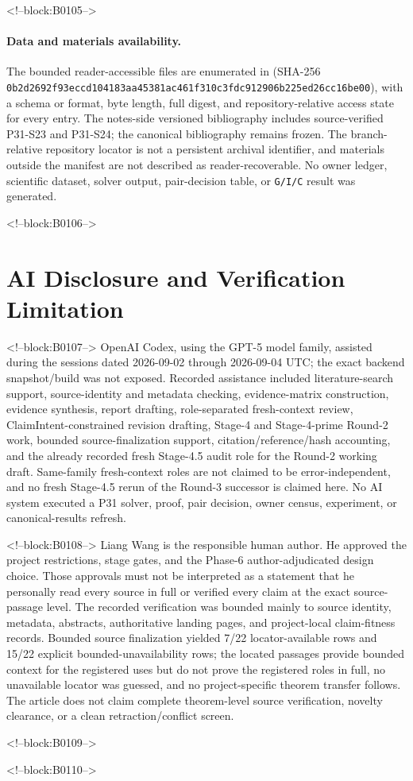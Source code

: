 \documentclass[11pt]{article}
\begin{document}
<!--block:B0105-->
\paragraph{Data and materials availability.}\begingroup\sloppy
The bounded reader-accessible files
are enumerated in
 (SHA-256
\texttt{0b2d2692f93eccd1\allowbreak{}04183aa45381ac46\allowbreak{}1f310c3fdc912906\allowbreak{}b225ed26cc16be00}), with a schema or format, byte length, full digest, and
repository-relative access state for every entry.  The notes-side versioned
bibliography includes source-verified P31-S23 and P31-S24; the canonical
bibliography remains frozen.  The branch-relative repository locator is not a
persistent archival identifier, and materials outside the manifest are not
described as reader-recoverable.  No owner ledger, scientific dataset, solver
output, pair-decision table, or \texttt{G/I/C} result was generated.
\par\endgroup

<!--block:B0106-->
\hypertarget{ai-disclosure-and-verification-limitation}{%
\section*{AI Disclosure and Verification
Limitation}\label{ai-disclosure-and-verification-limitation}}

<!--block:B0107-->
OpenAI Codex, using the GPT-5 model family, assisted during the
sessions dated 2026-09-02 through 2026-09-04 UTC; the exact backend
snapshot/build was not exposed. Recorded assistance included literature-search
support, source-identity and metadata checking, evidence-matrix construction,
evidence synthesis, report drafting, role-separated fresh-context review,
ClaimIntent-constrained revision drafting, Stage-4 and Stage-4-prime Round-2
work, bounded source-finalization support, citation/reference/hash accounting,
and the already recorded fresh Stage-4.5 audit role for the Round-2 working
draft. Same-family fresh-context roles are not claimed to be error-independent,
and no fresh Stage-4.5 rerun of the Round-3 successor is claimed here. No AI
system executed a P31 solver, proof, pair decision, owner census, experiment, or
canonical-results refresh.

<!--block:B0108-->
Liang Wang is the responsible human author. He approved the project
restrictions, stage gates, and the Phase-6 author-adjudicated design
choice. Those approvals must not be interpreted as a statement that he
personally read every source in full or verified every claim at the exact
source-passage level. The recorded verification was bounded mainly to
source identity, metadata, abstracts, authoritative landing pages, and
project-local claim-fitness records. Bounded source finalization yielded
7/22 locator-available rows and 15/22 explicit bounded-unavailability rows;
the located passages provide bounded context for the registered uses but do not
prove the registered roles in full, no unavailable locator was guessed, and no
project-specific theorem transfer follows. The
article does not claim complete theorem-level source verification, novelty
clearance, or a clean retraction/conflict screen.

<!--block:B0109-->



<!--block:B0110-->
\end{document}
